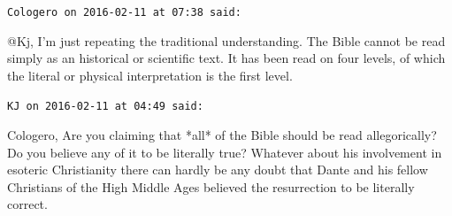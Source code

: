 \begin{footnotesize}
\begin{sffamily}
\hfill

\texttt{Cologero on 2016-02-11 at 07:38 said:}

@Kj, I'm just repeating the traditional understanding. The Bible cannot be read simply as an historical or scientific text. It has been read on four levels, of which the literal or physical interpretation is the first level.

\hfill

\texttt{KJ on 2016-02-11 at 04:49 said:}

Cologero, Are you claiming that *all* of the Bible should be read allegorically? Do you believe any of it to be literally true? Whatever about his involvement in esoteric Christianity there can hardly be any doubt that Dante and his fellow Christians of the High Middle Ages believed the resurrection to be literally correct.

\end{sffamily}
\end{footnotesize}


